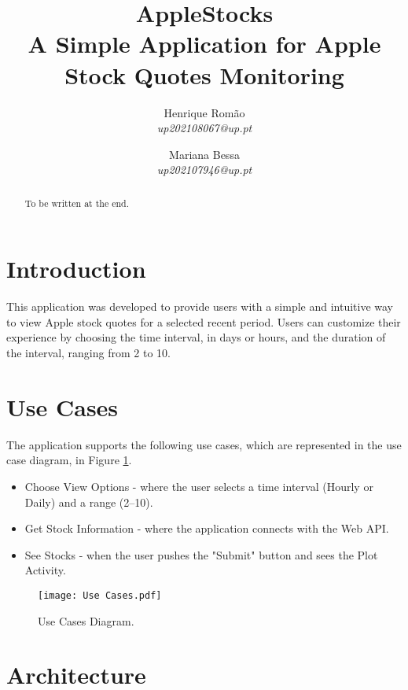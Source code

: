 \documentclass{article}
\title{\Huge \textbf{AppleStocks}\\\vspace{0.2em} \Large A Simple Application for Apple Stock Quotes Monitoring}
\author{
    Henrique Romão \\ 
    \textit{up202108067@up.pt} 
    \and 
    Mariana Bessa \\ 
    \textit{up202107946@up.pt}
}
\begin{document}
\maketitle

\begin{abstract}
    To be written at the end.
\end{abstract}

\tableofcontents

\newpage

\section{Introduction}
This application was developed to provide users with a simple and intuitive way to view Apple stock quotes for a selected recent period. 
Users can customize their experience by choosing the time interval, in days or hours, and the duration of the interval, ranging from 2 to 10.

\section{Use Cases}
The application supports the following use cases, which are represented in the use case diagram, in Figure \ref{fig:UseCases}.
\begin{itemize}
    \item Choose View Options - where the user selects a time interval (Hourly or Daily) and a range (2–10).
    \item Get Stock Information - where the application connects with the Web API.
    \item See Stocks - when the user pushes the "Submit" button and sees the Plot Activity.
\end{itemize}

\begin{figure}[ht]
    \centering
    \texttt{[image: Use Cases.pdf]}
    \caption{Use Cases Diagram.}
    \label{fig:UseCases}
\end{figure}

\section{Architecture}
\end{document}
